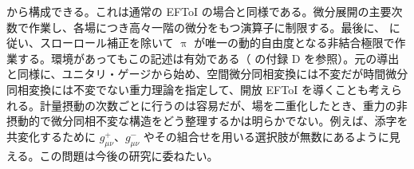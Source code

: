 \documentclass[a4paper,11pt]{ltjsarticle}
\numberwithin{equation}{section}
\begin{document}
から構成できる。これは通常の EFToI \cite{Hongo:2018ant} の場合と同様である。微分展開の主要次数で作業し、各場につき高々一階の微分をもつ演算子に制限する。最後に、\cite{LopezNacir:2011kk} に従い、スローロール補正を除いて $\uppi$ が唯一の動的自由度となる非結合極限で作業する。環境があってもこの記述は有効である（\cite{LopezNacir:2011kk} の付録 D を参照）。元の導出 \cite{Cheung:2007st} と同様に、ユニタリ・ゲージから始め、空間微分同相変換には不変だが時間微分同相変換には不変でない重力理論を指定して、開放 EFToI を導くことも考えられる。計量摂動の次数ごとに行うのは容易だが、場を二重化したとき、重力の非摂動的で微分同相不変な構造をどう整理するかは明らかでない。例えば、添字を共変化するために $g^+_{\mu\nu}$、$g^-_{\mu\nu}$ やその組合せを用いる選択肢が無数にあるように見える。この問題は今後の研究に委ねたい。


\end{document}
